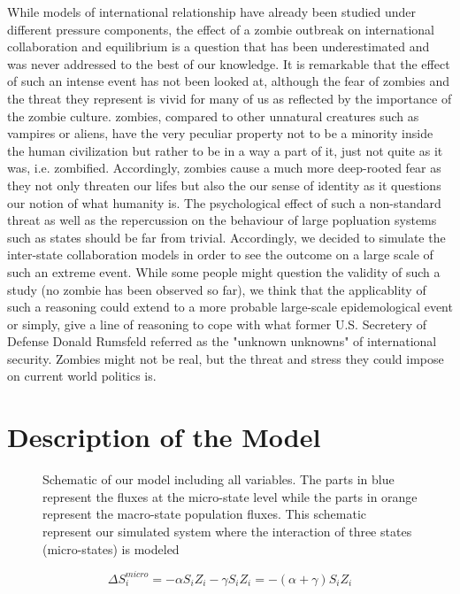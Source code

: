 \documentclass[11pt]{article}
\begin{document}
While models of international relationship have already been studied under different pressure components, the effect of a zombie outbreak on international collaboration and equilibrium is a question that has been underestimated and was never addressed to the best of our knowledge. It is remarkable that the effect of such an intense event has not been looked at, although the fear of zombies and the threat they represent is vivid for many of us as reflected by the importance of the zombie culture. zombies, compared to other unnatural creatures such as vampires or aliens, have the very peculiar property not to be a minority inside the human civilization but rather to be in a way a part of it, just not quite as it was, i.e. zombified. Accordingly, zombies cause a much more deep-rooted fear as they not only threaten our lifes but also the our sense of identity as it questions our notion of what humanity is. The psychological effect of such a non-standard threat as well as the repercussion on the behaviour of large popluation systems such as states should be far from trivial. Accordingly, we decided to simulate the inter-state collaboration models in order to see the outcome on a large scale of such an extreme event. While some people might question the validity of such a study (no zombie has been observed so far), we think that the applicablity of such a reasoning could extend to a more probable large-scale epidemological event or simply, give a line of reasoning to cope with what former U.S. Secretery of Defense Donald Rumsfeld referred as the "unknown unknowns" of international security. Zombies might not be real, but the threat and stress they could impose on current world politics is. 

\section{Description of the Model}\indent

\begin{figure}[h!]
\centering
\caption{Schematic of our model including all variables. The parts in blue represent the fluxes at the micro-state level while the parts in orange represent the macro-state population fluxes. This schematic represent our simulated system where the interaction of three states (micro-states) is modeled }
\end{figure}

\begin{equation}
\Delta S_{i}^{micro} = -\alpha S_{i} Z_{i} -\gamma S_{i} Z_{i} = -(\alpha + \gamma) S_{i} Z_{i}
\end{equation}
\end{document}
